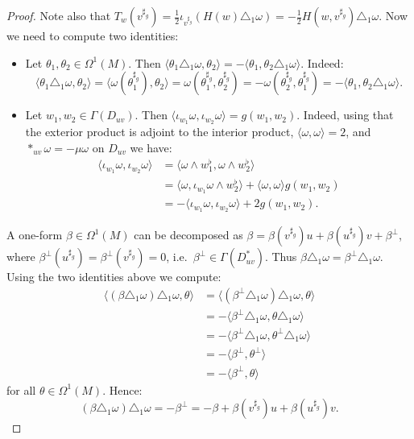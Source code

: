 \documentclass[10pt,a4paper,twoside,reqno]{amsart}
\theoremstyle{plain}
\theoremstyle{definition}
\theoremstyle{remark}
\newcommand{\escal}[1]{\langle#1\rangle}
\begin{document}
\begin{proof}
    Note also that $T_w(v^{\sharp_g})=\frac{1}{2}\iota_{v^{\sharp_g}}(H(w)\triangle_1\omega)=-\frac{1}{2}H(w,v^{\sharp_g})\triangle_1\omega$. Now we need to compute two identities: \begin{itemize}
        \item Let $\theta_1,\theta_2\in\Omega^1(M)$. Then $\escal{\theta_1\triangle_1\omega,\theta_2}=-\escal{\theta_1,\theta_2\triangle_1\omega}$. Indeed: $$\escal{\theta_1\triangle_1\omega,\theta_2}=\escal{\omega(\theta_1^{\sharp_g}),\theta_2}=\omega(\theta_1^{\sharp_g},\theta_2^{\sharp_g})=-\omega(\theta_2^{\sharp_g},\theta_1^{\sharp_g})=-\escal{\theta_1,\theta_2\triangle_1\omega}.$$
        \item Let $w_1,w_2\in\Gamma(D_{uv})$. Then $\escal{\iota_{w_1}\omega,\iota_{w_2}\omega}=g(w_1,w_2)$. Indeed, using that the exterior product is adjoint to the interior product, $\escal{\omega,\omega}=2$, and $*_{uv}\omega=-\mu\omega$ on $D_{uv}$ we have: \begin{align*}
            \escal{\iota_{w_1}\omega,\iota_{w_2}\omega}&=\escal{\omega\wedge w_1^\flat,\omega\wedge w_2^\flat}\\
            &=\escal{\omega,\iota_{w_1}\omega\wedge w_2^\flat}+\escal{\omega,\omega}g(w_1,w_2)\\
            &=-\escal{\iota_{w_1}\omega,\iota_{w_2}\omega}+2g(w_1,w_2).
        \end{align*}
    \end{itemize}

    A one-form $\beta\in\Omega^1(M)$ can be decomposed as $\beta=\beta(v^{\sharp_g})u+\beta(u^{\sharp_g})v+\beta^\perp$, where $\beta^\perp(u^{\sharp_g})=\beta^\perp(v^{\sharp_g})=0$, i.e.\ $\beta^\perp\in\Gamma(D_{uv}^*)$. Thus $\beta\triangle_1\omega=\beta^\perp\triangle_1\omega$. Using the two identities above we compute: \begin{align*}
        \escal{(\beta\triangle_1\omega)\triangle_1\omega,\theta}&=\escal{(\beta^\perp\triangle_1\omega)\triangle_1\omega,\theta}\\
        &=-\escal{\beta^\perp\triangle_1\omega,\theta\triangle_1\omega}\\
        &=-\escal{\beta^\perp\triangle_1\omega,\theta^\perp\triangle_1\omega}\\
        &=-\escal{\beta^\perp,\theta^\perp}\\
        &=-\escal{\beta^\perp,\theta}
    \end{align*} for all $\theta\in\Omega^1(M)$. Hence: $$(\beta\triangle_1\omega)\triangle_1\omega=-\beta^\perp=-\beta+\beta(v^{\sharp_g})u+\beta(u^{\sharp_g})v.$$


\end{proof}
\end{document}
